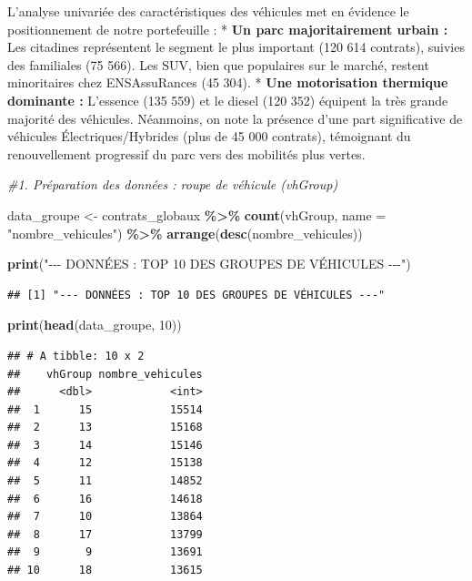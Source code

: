 \documentclass[
]{article}
\newenvironment{Shaded}{\begin{snugshade}}{\end{snugshade}}
\newcommand{\AttributeTok}[1]{\textcolor[rgb]{0.13,0.29,0.53}{#1}}
\newcommand{\CommentTok}[1]{\textcolor[rgb]{0.56,0.35,0.01}{\textit{#1}}}
\newcommand{\DecValTok}[1]{\textcolor[rgb]{0.00,0.00,0.81}{#1}}
\newcommand{\FunctionTok}[1]{\textcolor[rgb]{0.13,0.29,0.53}{\textbf{#1}}}
\newcommand{\NormalTok}[1]{#1}
\newcommand{\OtherTok}[1]{\textcolor[rgb]{0.56,0.35,0.01}{#1}}
\newcommand{\SpecialCharTok}[1]{\textcolor[rgb]{0.81,0.36,0.00}{\textbf{#1}}}
\newcommand{\StringTok}[1]{\textcolor[rgb]{0.31,0.60,0.02}{#1}}
\begin{document}
L'analyse univariée des caractéristiques des véhicules met en évidence
le positionnement de notre portefeuille : * \textbf{Un parc
majoritairement urbain :} Les citadines représentent le segment le plus
important (120 614 contrats), suivies des familiales (75 566). Les SUV,
bien que populaires sur le marché, restent minoritaires chez
ENSAssuRances (45 304). * \textbf{Une motorisation thermique dominante
:} L'essence (135 559) et le diesel (120 352) équipent la très grande
majorité des véhicules. Néanmoins, on note la présence d'une part
significative de véhicules Électriques/Hybrides (plus de 45 000
contrats), témoignant du renouvellement progressif du parc vers des
mobilités plus vertes.

\begin{Shaded}
\begin{Highlighting}[]
\CommentTok{\#1. Préparation des données : roupe de véhicule (vhGroup)}

\NormalTok{data\_groupe }\OtherTok{\textless{}{-}}\NormalTok{ contrats\_globaux }\SpecialCharTok{\%\textgreater{}\%} 
  \FunctionTok{count}\NormalTok{(vhGroup, }\AttributeTok{name =} \StringTok{"nombre\_vehicules"}\NormalTok{) }\SpecialCharTok{\%\textgreater{}\%}
  \FunctionTok{arrange}\NormalTok{(}\FunctionTok{desc}\NormalTok{(nombre\_vehicules))}

\FunctionTok{print}\NormalTok{(}\StringTok{"{-}{-}{-} DONNÉES : TOP 10 DES GROUPES DE VÉHICULES {-}{-}{-}"}\NormalTok{)}
\end{Highlighting}
\end{Shaded}

\begin{verbatim}
## [1] "--- DONNÉES : TOP 10 DES GROUPES DE VÉHICULES ---"
\end{verbatim}

\begin{Shaded}
\begin{Highlighting}[]
\FunctionTok{print}\NormalTok{(}\FunctionTok{head}\NormalTok{(data\_groupe, }\DecValTok{10}\NormalTok{))}
\end{Highlighting}
\end{Shaded}

\begin{verbatim}
## # A tibble: 10 x 2
##    vhGroup nombre_vehicules
##      <dbl>            <int>
##  1      15            15514
##  2      13            15168
##  3      14            15146
##  4      12            15138
##  5      11            14852
##  6      16            14618
##  7      10            13864
##  8      17            13799
##  9       9            13691
## 10      18            13615
\end{verbatim}
\end{document}
